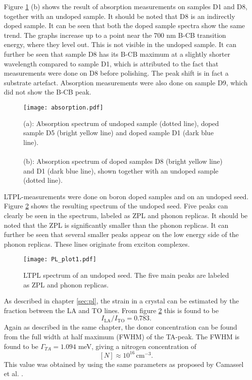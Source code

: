 Figure \ref{fig:abs} (b) shows the result of absorption measurements on samples D1 and D8, together with an undoped sample. It should be noted that D8 is an indirectly doped sample. It can be seen that both the doped sample spectra show the same trend. The graphs increase up to a point near the 700 nm B-CB transition energy, where they level out. This is not visible in the undoped sample. It can further be seen that sample D8 has its B-CB maximum at a slightly shorter wavelength compared to sample D1, which is attributed to the fact that measurements were done on D8 before polishing. The peak shift is in fact a substrate artefact. Absorption measurements were also done on sample D9, which did not show the B-CB peak. 

\begin{figure}[H]
\begin{center}
\texttt{[image: absorption.pdf]}
\caption{
(a): Absorption spectrum of undoped sample (dotted line), doped sample D5 (bright yellow line) and doped sample D1 (dark blue line). \\ \\
(b): Absorption spectrum of doped samples D8 (bright yellow line) and D1 (dark blue line), shown together with an undoped sample (dotted line). 
\label{fig:abs}}
\end{center}
\end{figure}

\newpage
LTPL-measurements were done on boron doped samples and on an undoped seed. Figure \ref{fig:pl_spectrum1} shows the resulting spectrum of the undoped seed. Five peaks can clearly be seen in the spectrum, labeled as ZPL and phonon replicas. It should be noted that the ZPL is significantly smaller than the phonon replicas. It can further be seen that several smaller peaks appear on the low energy side of the phonon replicas. These lines originate from exciton complexes.  

\begin{figure}[h]
\begin{center}
\texttt{[image: PL\_plot1.pdf]}
\caption{LTPL spectrum of an undoped seed. The five main peaks are labeled as ZPL and phonon replicas. 
\label{fig:pl_spectrum1}}
\end{center}
\end{figure}

As described in chapter \ref{sec:pl}, the strain in a crystal can be estimated by the fraction between the LA and TO lines. From figure \ref{fig:pl_spectrum1} this is found to be 
\[I_\mathrm{LA}/I_\mathrm{TO} = 0.783.\]
Again as described in the same chapter, the donor concentration can be found from the full width at half maximum (FWHM) of the TA-peak. The FWHM is found to be $\Gamma_{TA} = 1.094$ meV, giving a nitrogen concentration of 
\[[N] \approx 10^{16} \, \mathrm{cm^{-3}}.\]
This value was obtained by using the same parameters as proposed by Camassel et al. \cite{Camassel2006}. 

